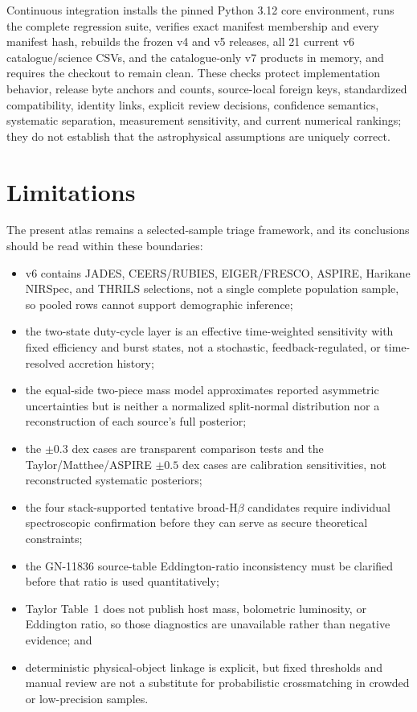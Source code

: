 \documentclass[11pt]{article}
\begin{document}
Continuous integration installs the pinned Python 3.12 core environment, runs the complete regression suite, verifies exact manifest membership and every manifest hash, rebuilds the frozen v4 and v5 releases, all 21 current v6 catalogue/science CSVs, and the catalogue-only v7 products in memory, and requires the checkout to remain clean. These checks protect implementation behavior, release byte anchors and counts, source-local foreign keys, standardized compatibility, identity links, explicit review decisions, confidence semantics, systematic separation, measurement sensitivity, and current numerical rankings; they do not establish that the astrophysical assumptions are uniquely correct.

\section{Limitations}

The present atlas remains a selected-sample triage framework, and its conclusions should be read within these boundaries:

\begin{itemize}
  \item v6 contains JADES, CEERS/RUBIES, EIGER/FRESCO, ASPIRE, Harikane NIRSpec, and THRILS selections, not a single complete population sample, so pooled rows cannot support demographic inference;\par
  \item the two-state duty-cycle layer is an effective time-weighted sensitivity with fixed efficiency and burst states, not a stochastic, feedback-regulated, or time-resolved accretion history;\par
  \item the equal-side two-piece mass model approximates reported asymmetric uncertainties but is neither a normalized split-normal distribution nor a reconstruction of each source's full posterior;\par
  \item the $\pm0.3$ dex cases are transparent comparison tests and the Taylor/Matthee/ASPIRE $\pm0.5$ dex cases are calibration sensitivities, not reconstructed systematic posteriors;\par
  \item the four stack-supported tentative broad-H$\beta$ candidates require individual spectroscopic confirmation before they can serve as secure theoretical constraints;\par
  \item the GN-11836 source-table Eddington-ratio inconsistency must be clarified before that ratio is used quantitatively;\par
  \item Taylor Table~1 does not publish host mass, bolometric luminosity, or Eddington ratio, so those diagnostics are unavailable rather than negative evidence; and\par
  \item deterministic physical-object linkage is explicit, but fixed thresholds and manual review are not a substitute for probabilistic crossmatching in crowded or low-precision samples.\par
\end{itemize}
\end{document}

